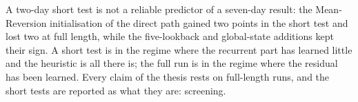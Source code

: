 A two-day short test is not a reliable
predictor of a seven-day result: the Mean-Reversion initialisation of the direct path gained
two points in the short test and lost two at full length, while the five-lookback and
global-state additions kept their sign.  A short test is in the regime where the recurrent
part has learned little and the heuristic is all there is; the full run is in the regime
where the residual has been learned.  Every claim of the thesis rests on full-length runs,
and the short tests are reported as what they are: screening.
